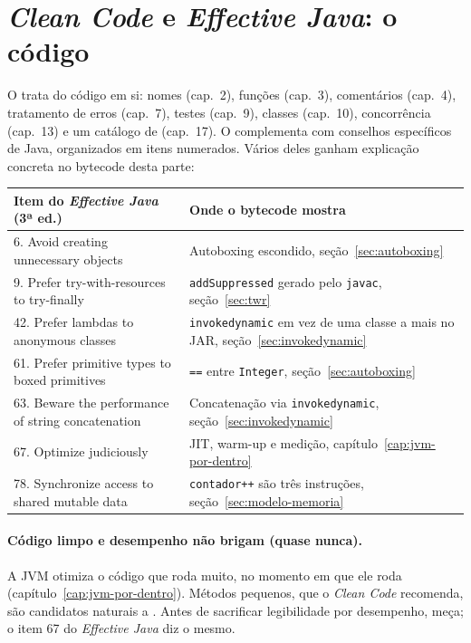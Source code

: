 \section{\emph{Clean Code} e \emph{Effective Java}: o código}

O  trata do código em si: nomes (cap.~2),
funções (cap.~3), comentários (cap.~4), tratamento de erros (cap.~7),
testes (cap.~9), classes (cap.~10), concorrência (cap.~13) e um catálogo
de  (cap.~17). O
 complementa com conselhos específicos de
Java, organizados em itens numerados. Vários deles ganham explicação
concreta no bytecode desta parte:

\small
\begin{longtable}{@{}p{5.6cm} p{6.6cm}@{}}
\toprule
Item do \emph{Effective Java} (3ª ed.) & Onde o bytecode mostra \\
\midrule \endhead
6. Avoid creating unnecessary objects & Autoboxing escondido,
  seção~\ref{sec:autoboxing} \\
9. Prefer try-with-resources to try-finally & \texttt{addSuppressed}
  gerado pelo \texttt{javac}, seção~\ref{sec:twr} \\
42. Prefer lambdas to anonymous classes & \texttt{invokedynamic} em vez
  de uma classe a mais no JAR, seção~\ref{sec:invokedynamic} \\
61. Prefer primitive types to boxed primitives & \texttt{==} entre
  \texttt{Integer}, seção~\ref{sec:autoboxing} \\
63. Beware the performance of string concatenation & Concatenação via
  \texttt{invokedynamic}, seção~\ref{sec:invokedynamic} \\
67. Optimize judiciously & JIT, warm-up e medição,
  capítulo~\ref{cap:jvm-por-dentro} \\
78. Synchronize access to shared mutable data & \texttt{contador++} são
  três instruções, seção~\ref{sec:modelo-memoria} \\
\bottomrule
\end{longtable}
\normalsize

\paragraph{Código limpo e desempenho não brigam (quase nunca).}
A JVM otimiza o código que roda muito, no momento em que ele roda
(capítulo~\ref{cap:jvm-por-dentro}). Métodos pequenos, que o
\emph{Clean Code} recomenda, são candidatos naturais a
. Antes de sacrificar
legibilidade por desempenho, meça; o item 67 do \emph{Effective Java}
diz o mesmo.
